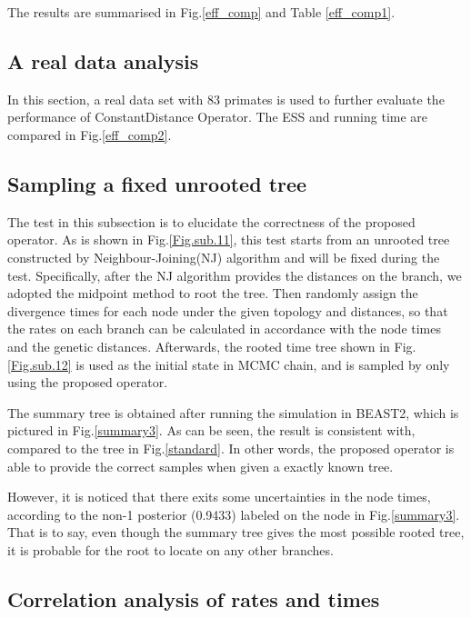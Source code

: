 \documentclass{bmcart}
\begin{document}
The results are summarised in Fig.\ref{eff_comp} and Table \ref{eff_comp1}.
\subsection*{A real data analysis}
In this section, a real data set with 83 primates is used to further evaluate the performance of ConstantDistance Operator. The ESS and running time are compared in Fig.\ref{eff_comp2}.

\subsection*{Sampling a fixed unrooted tree}
The test in this subsection is to elucidate the correctness of the proposed operator. As is shown in Fig.\ref{Fig.sub.11}, this test starts from an unrooted tree constructed by Neighbour-Joining(NJ) algorithm and will be fixed during the test. Specifically, after the NJ algorithm provides the distances on the branch, we adopted the midpoint method to root the tree. Then randomly assign the divergence times for each node under the given topology and distances, so that the rates on each branch can be calculated in accordance with the node times and the genetic distances. Afterwards, the rooted time tree shown in Fig.\ref{Fig.sub.12} is used as the initial state in MCMC chain, and is sampled by only using the proposed operator.

The summary tree is obtained after running the simulation in BEAST2, which is pictured in Fig.\ref{summary3}. As can be seen, the result is consistent with, compared to the tree in Fig.\ref{standard}. In other words, the proposed operator is able to provide the correct samples when given a exactly known tree.

However, it is noticed that there exits some uncertainties in the node times, according to the non-1 posterior (0.9433) labeled on the node in Fig.\ref{summary3}. That is to say, even though the summary tree gives the most possible rooted tree, it is probable for the root to locate on any other branches.

\subsection*{Correlation analysis of rates and times}
\end{document}
